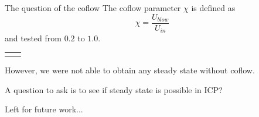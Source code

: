 \documentclass[24pt,t,table, aspectratio=169]{beamer}
\begin{document}
\begin{frame}{The question of the coflow}
{
The coflow parameter $\chi$ is defined as
\begin{equation*}
\chi = \frac{U_{blow}}{U_{in}}
\end{equation*}
and tested from $0.2$ to $1.0$.
}

{
\begin{tabular}{cc}
 & 
\end{tabular}
}

{
 However, we were not able to obtain any steady state without coflow.

 A question to ask is to see if steady state is possible in ICP?
 
 Left for future work... 
 
}

\end{frame}
\end{document}
